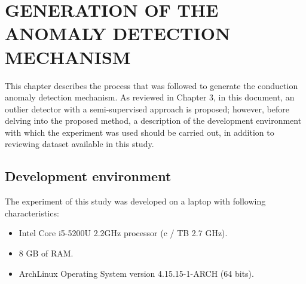 \chapter{\uppercase{GENERATION OF THE ANOMALY DETECTION MECHANISM}}
\label{Capitulo 5}

This chapter describes the process that was followed to generate the conduction anomaly detection mechanism. As reviewed in Chapter 3, in this document, an outlier detector with a semi-supervised approach is proposed; however, before delving into the proposed method, a description of the development environment with which the experiment was used should be carried out, in addition to reviewing dataset available in this study.

\section{Development environment}

The experiment of this study was developed on a laptop with following characteristics:

\begin{itemize}
\item Intel Core i5-5200U 2.2GHz processor (c / TB 2.7 GHz).
\item 8 GB of RAM.
\item ArchLinux Operating System version 4.15.15-1-ARCH (64 bits).
\end{itemize}

